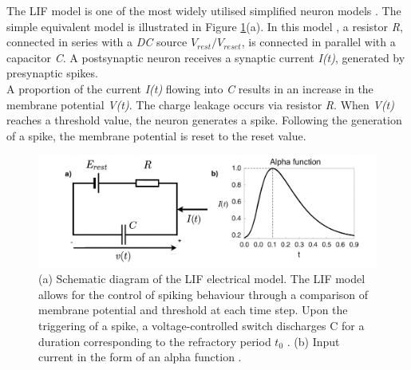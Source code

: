 \noindent The LIF model is one of the most widely utilised simplified neuron models \cite{lapique1907researches}. The simple equivalent model is illustrated in Figure \ref{fig:2d}(a). In this model \cite{stein1967frequency}, a resistor \textit{R}, connected in series with a \textit{DC} source $V_{rest}/V_{reset}$, is connected in parallel with a capacitor \textit{C}. A postsynaptic neuron receives a synaptic current \textit{I(t)}, generated by presynaptic spikes. \\

\noindent A proportion of the current \textit{I(t)} flowing into \textit{C} results in an increase in the membrane potential \textit{V(t)}. The charge leakage occurs via resistor \textit{R}. When \textit{V(t)} reaches a threshold value, the neuron generates a spike. Following the generation of a spike, the membrane potential is reset to the reset value. \\


\begin{figure}[htbp!] 
    \centering    
    \includegraphics[width=1\textwidth]{Chapter2/Figs/d.png}
    \caption[The Leaky Integrate-and-Fire neuron model.]{(a) Schematic diagram of the LIF electrical model. The LIF model allows for the control of spiking behaviour through a comparison of membrane potential and threshold at each time step. Upon the triggering of a spike, a voltage-controlled switch discharges C for a duration corresponding to the refractory period $t_0$ \cite{tal1997computing}. (b) Input current in the form of an alpha function \cite{teeter2018generalized}.}
    \label{fig:2d}
\end{figure}

